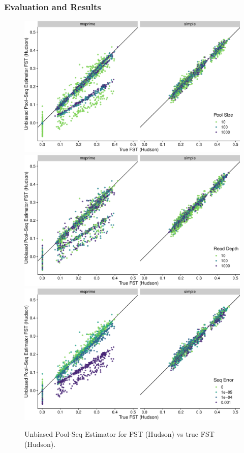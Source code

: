 \documentclass[a4paper,fontsize=9pt,DIV=14]{scrartcl}
\begin{document}

\subsubsection*{Evaluation and Results}
\label{supp:sec:FST:sub:Comparison:sub:Results}

\begin{figure}[p]
    \centering
    \includegraphics[width=.75\linewidth]{true_hudson_fst-est_spence_hudson-pool_size.pdf}
    \includegraphics[width=.75\linewidth]{true_hudson_fst-est_spence_hudson-read_depth.pdf}
    \includegraphics[width=.75\linewidth]{true_hudson_fst-est_spence_hudson-seq_error.pdf}
    \vspace*{-1em}
    \caption{
        Unbiased Pool-Seq Estimator for FST (Hudson) vs true FST (Hudson).
    }
\label{fig:UnbiasedHudson}
\end{figure}
\end{document}
